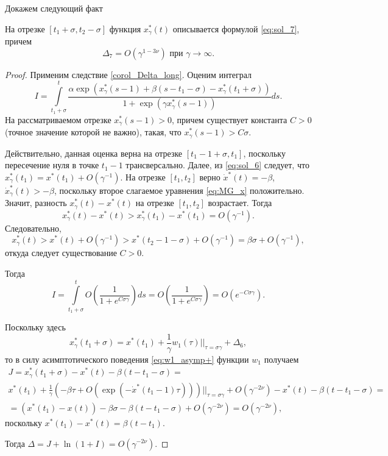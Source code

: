 Докажем следующий факт
\begin{lemma}
\label{lm:Delta_7}
На отрезке $[t_1 + \sigma, t_2 - \sigma]$ функция $x_\gamma^*(t)$ описывается формулой \eqref{eq:sol_7}, причем
\[
\Delta_7 = O(\gamma^{1 - 3\nu})\text{ при }\gamma\to\infty.
\]
\end{lemma}
\begin{proof}
Применим следствие \ref{corol_Delta_long}.
Оценим интеграл
%
\begin{equation*}
	I = \int \limits_{t_1+\sigma}^{t}\frac{\alpha\exp(x_\gamma^*(s - 1) + \beta(s - t_1 - \sigma) - x_\gamma^*(t_1 + \sigma))}{1  +\exp(\gamma x_\gamma^*(s - 1))}ds.
\end{equation*}
%
На рассматриваемом отрезке $x_\gamma^*(s - 1) > 0$, причем существует константа $C > 0$ (точное значение которой не важно), такая, что $x_\gamma^*(s-1) > C\sigma.$

Действительно, данная оценка верна на отрезке $[t_1 - 1 + \sigma, t_1]$, поскольку пересечение нуля в точке $t_1 - 1$ трансверсально. Далее, из \eqref{eq:sol_6} следует, что $x^*_{\gamma}(t_1) = x^*(t_1) + O(\gamma^{-1})$. На отрезке $[t_1, t_2]$ верно $\dot{x}^*(t) = -\beta$, $\dot{x}^*_\gamma(t) > -\beta$, поскольку второе слагаемое уравнения \eqref{eq:MG_x} положительно. Значит, разность $x^*_{\gamma}(t) - x^*(t)$ на отрезке $[t_1, t_2]$ возрастает. Тогда
%
\[
x^*_{\gamma}(t) - x^*(t) > x^*_{\gamma}(t_1) - x^*(t_1) = O(\gamma^{-1}).
\]
%
Следовательно,
%
\[
x^*_{\gamma}(t) > x^*(t) + O(\gamma^{-1}) > x^*(t_2 - 1 - \sigma) + O(\gamma^{-1}) = \beta\sigma + O(\gamma^{-1}),
\]
откуда следует существование $C > 0$.
	
Тогда
\begin{equation}
	\label{I_step7}
	I = \int\limits_{t_1+\sigma}^{t} O\left(\frac{1}{1 + e^{C \sigma \gamma}}\right) ds = O\left(\frac{1}{1 + e^{C \sigma \gamma}}\right) = O(e^{-C\sigma\gamma}).
\end{equation}

Поскольку здесь
\[
x_\gamma^*(t_1+\sigma) = x^*(t_1) + \frac{1}{\gamma} w_1(\tau)\bigg\vert|_{\tau=\sigma\gamma} + \Delta_6,
\]
то в силу асимптотического поведения \eqref{eq:w1_asymp+} функции $w_1$ получаем
\begin{multline*}
	J = x_\gamma^*(t_1 + \sigma) - x^*(t) - \beta(t - t_1 - \sigma) =\\
	x^*(t_1) + \frac{1}{\gamma} (-\beta\tau + O(\exp(-\dot{x}^*(t_1 - 1) \tau)))\bigg\vert|_{\tau = \sigma\gamma} + O(\gamma^{-2\nu}) - x^*(t) - \beta(t - t_1 - \sigma) =\\
	= (x^*(t_1) - x(t)) - \beta \sigma - \beta(t - t_1 - \sigma) + O(\gamma^{-2\nu}) = O(\gamma^{-2\nu}),
\end{multline*}
поскольку $x^*(t_1) - x^*(t) = \beta (t - t_1)$.

Тогда $\Delta = J + \ln(1 + I) = O(\gamma^{-2\nu})$.
	
\end{proof}

